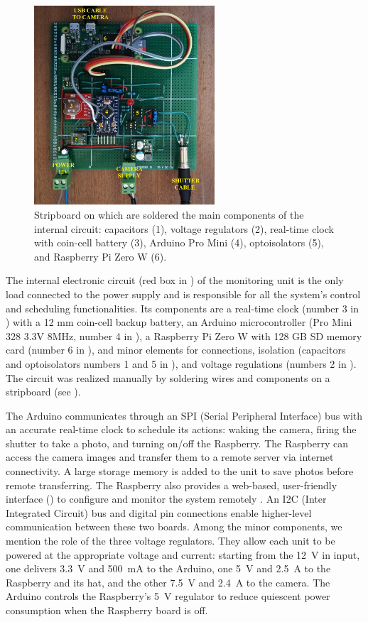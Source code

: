 \begin{figure}[ht!]
  \centering
  \includegraphics[width=0.6\textwidth]{board.jpg}
  \caption{Stripboard on which are soldered the main components of the internal
    circuit: capacitors (1), voltage regulators (2), real-time clock with coin-cell battery (3), Arduino Pro Mini (4), optoisolators (5), and Raspberry Pi Zero W (6).}
  \label{fig:4:circuit}
\end{figure}

The internal electronic circuit (red box in ) of the monitoring unit is the only load connected to the power supply and is responsible for all
the system's control and scheduling functionalities.
Its components are a real-time clock (number 3 in ) with a 12 mm coin-cell backup battery, an Arduino microcontroller (Pro  Mini 328 3.3V 8MHz, number 4 in ), a Raspberry Pi Zero W with 128 GB SD memory card (number 6 in ), and minor elements for connections, isolation (capacitors and optoisolators numbers 1 and 5 in ), and voltage regulations (numbers 2 in ).
The circuit was realized manually by soldering wires and components on a stripboard (see ).

The Arduino communicates through an SPI (Serial Peripheral Interface) bus with an accurate real-time clock to schedule its actions: waking the camera, firing the shutter to take a photo, and turning on/off the Raspberry. 
The Raspberry can access the camera images and transfer them to a remote server via internet connectivity. 
A large storage memory is added to the unit to save photos before remote transferring. 
The Raspberry also provides a web-based, user-friendly interface () to configure and monitor the system remotely
\citep{greig}.
An I2C (Inter Integrated Circuit) bus and digital pin connections enable higher-level communication between these two boards. 
Among the minor components, we mention the role of the three voltage regulators. 
They allow each unit to be powered at the appropriate voltage and current: starting from the 12~V in input, one delivers 3.3~V and 500~mA to
the Arduino, one 5~V and 2.5~A to the Raspberry and its hat, and the other 7.5~V and 2.4~A to the camera.
The Arduino controls the Raspberry's 5~V regulator to reduce quiescent power consumption when the Raspberry board is off.

